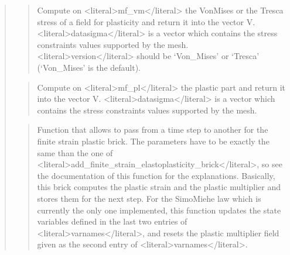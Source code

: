 \documentclass[a4paper,11pt,english]{sphinxmanual}
\begin{document}
\begin{quote}
\sphinxAtStartPar
{}
\begin{quote}

\sphinxAtStartPar
Compute on \textless{}literal\textgreater{}mf\_vm\textless{}/literal\textgreater{} the Von\sphinxhyphen{}Mises or the Tresca stress of a field for plasticity and return it into the vector V.
\textless{}literal\textgreater{}datasigma\textless{}/literal\textgreater{} is a vector which contains the stress constraints values supported by the mesh.
\textless{}literal\textgreater{}version\textless{}/literal\textgreater{} should be  ‘Von\_Mises’ or ‘Tresca’ (‘Von\_Mises’ is the default).
\end{quote}

\sphinxAtStartPar
{}
\begin{quote}

\sphinxAtStartPar
Compute on \textless{}literal\textgreater{}mf\_pl\textless{}/literal\textgreater{} the plastic part and return it into the vector V.
\textless{}literal\textgreater{}datasigma\textless{}/literal\textgreater{} is a vector which contains the stress constraints values supported by the mesh.
\end{quote}

\sphinxAtStartPar
{}
\begin{quote}

\sphinxAtStartPar
Function that allows to pass from a time step to another for the
finite strain plastic brick. The parameters have to be exactly the
same than the one of \textless{}literal\textgreater{}add\_finite\_strain\_elastoplasticity\_brick\textless{}/literal\textgreater{},
so see the documentation of this function for the explanations.
Basically, this brick computes the plastic strain
and the plastic multiplier and stores them for the next step.
For the Simo\sphinxhyphen{}Miehe law which is currently the only one implemented,
this function updates the state variables defined in the last two
entries of \textless{}literal\textgreater{}varnames\textless{}/literal\textgreater{}, and resets the plastic multiplier field given
as the second entry of \textless{}literal\textgreater{}varnames\textless{}/literal\textgreater{}.
\end{quote}


\end{quote}
\end{document}
